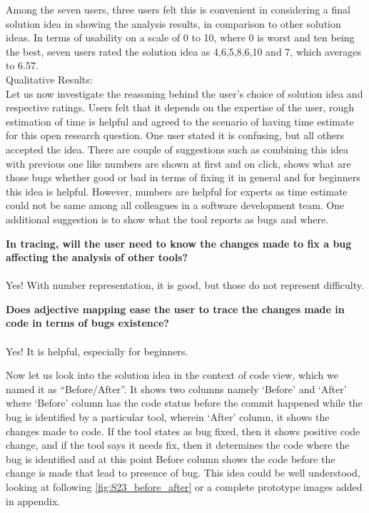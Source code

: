 Among the seven users, three users felt this is convenient in considering a final solution idea in showing the analysis results, in comparison to other solution ideas. In terms of usability on a scale of 0 to 10, where 0 is worst and ten being the best, seven users rated the solution idea as 4,6,5,8,6,10 and 7, which averages to 6.57. \\

Qualitative Results: \\

Let us now investigate the reasoning behind the user’s choice of solution idea and respective ratings. Users felt that it depends on the expertise of the user, rough estimation of time is helpful and agreed to the scenario of having time estimate for this open research question. One user stated it is confusing, but all others accepted the idea. There are couple of suggestions such as combining this idea with previous one like numbers are shown at first and on click, shows what are those bugs whether good or bad in terms of fixing it in general and for beginners this idea is helpful. However, numbers are helpful for experts as time estimate could not be same among all colleagues in a software development team. One additional suggestion is to show what the tool reports as bugs and where. \\

\begin{myboxi}{{\textbf{In tracing, will the user need to know the changes made to fix a bug affecting the analysis of other tools?}}}
\\ \\	Yes! With number representation, it is good, but those do not represent difficulty.
\end{myboxi}

\begin{myboxi} {{\textbf{Does adjective mapping ease the user to trace the changes made in code in terms of bugs existence?}}}
\\ \\	Yes! It is helpful, especially for beginners.
\end{myboxi}
	
Now let us look into the solution idea in the context of code view, which we named it as “Before/After”. It shows two columns namely ‘Before’ and ‘After’ where ‘Before’ column has the code status before the commit happened while the bug is identified by a particular tool, wherein ‘After’ column, it shows the changes made to code. If the tool states as bug fixed, then it shows positive code change, and if the tool says it needs fix, then it determines the code where the bug is identified and at this point Before column shows the code before the change is made that lead to presence of bug. This idea could be well understood, looking at following \autoref{fig:S23_before_after} or a complete prototype images added in appendix. \\ \\


